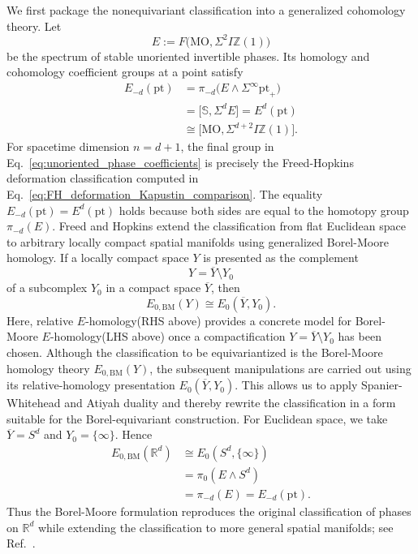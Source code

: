 \documentclass[aps,prx,reprint,superscriptaddress,twocolumn,amsmath,amssymb,amsfonts, nofootinbib]{revtex4-2}
\theoremstyle{apsstyle}
\begin{document}
We first package the nonequivariant classification into a generalized
cohomology theory. Let
\begin{equation}
    E := F\bigl(\mathrm{MO}, \Sigma^2I\mathbb Z(1)\bigr)
    \label{eq:unoriented_phase_spectrum}
\end{equation}
be the spectrum of stable unoriented invertible phases. Its homology
and cohomology coefficient groups at a point satisfy
\begin{equation}
\begin{aligned}
    E_{-d}(\mathrm{pt})
    &=\pi_{-d}
    \bigl(
        E\wedge\Sigma^\infty\mathrm{pt}_+
    \bigr)\\
    &= \bigl[
        \mathbb S,
        \Sigma^dE
    \bigr]= E^d(\mathrm{pt})\\
    &\cong \bigl[
        \mathrm{MO},
        \Sigma^{d+2}I\mathbb Z(1)
    \bigr].
\end{aligned}
\label{eq:unoriented_phase_coefficients}
\end{equation}
For spacetime dimension $n=d+1$, the final group in
Eq.~\eqref{eq:unoriented_phase_coefficients} is precisely the
Freed-Hopkins deformation classification computed in
Eq.~\eqref{eq:FH_deformation_Kapustin_comparison}.
The equality $E_{-d}(\mathrm{pt})=E^d(\mathrm{pt})$ holds because both sides are
equal to the homotopy group $\pi_{-d}(E)$.
Freed and Hopkins extend the classification from flat Euclidean space
to arbitrary locally compact spatial manifolds using generalized
Borel-Moore homology. If a locally compact space $Y$ is presented as
the complement
\begin{equation*}
    Y=\overline Y\setminus Y_0
\end{equation*}
of a subcomplex $Y_0$ in a compact space $\overline Y$, then
\begin{equation*}
    E_{0,\mathrm{BM}}(Y)
    \cong
    E_0(\overline Y,Y_0).
\end{equation*}
Here, relative $E$-homology(RHS above) provides a concrete model for Borel-Moore $E$-homology(LHS above) once a compactification $Y=\overline Y\setminus Y_0$ has been chosen. Although the classification to be equivariantized is the Borel-Moore homology theory $E_{0,\mathrm{BM}}(Y)$, the subsequent manipulations are carried out using its relative-homology presentation $E_0(\overline Y,Y_0)$. This allows us to apply Spanier-Whitehead and Atiyah duality and thereby rewrite the classification in a form suitable for the Borel-equivariant construction. For Euclidean space, we take
$\overline Y=S^d$ and $Y_0=\{\infty\}$. Hence
\begin{equation}
\begin{aligned}
    E_{0,\mathrm{BM}}(\mathbb R^d)
    &\cong
    E_0(S^d,\{\infty\})\\
    &=
    \pi_0(E\wedge S^d)\\
    &=
    \pi_{-d}(E)
    =
    E_{-d}(\mathrm{pt}).
\end{aligned}
\label{eq:BM_Euclidean_classification}
\end{equation}
Thus the Borel-Moore formulation reproduces the original
classification of phases on $\mathbb R^d$ while extending the
classification to more general spatial manifolds; see
Ref.~\cite[Eq.~(2.2)]{Freed2021}.
\end{document}
